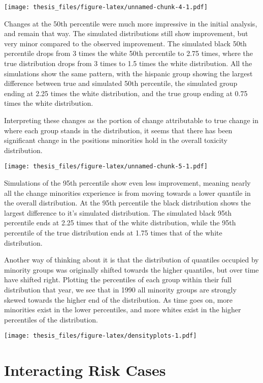 \documentclass[12pt,twoside]{dukestatscithesis}
\theoremstyle{definition}
\theoremstyle{definition}
\theoremstyle{definition}
\theoremstyle{remark}
\begin{document}
\texttt{[image: thesis\_files/figure-latex/unnamed-chunk-4-1.pdf]}

Changes at the 50th percentile were much more impressive in the initial
analysis, and remain that way. The simulated distributions still show
improvement, but very minor compared to the observed improvement. The
simulated black 50th percentile drops from 3 times the white 50th
percentile to 2.75 times, where the true distribution drops from 3 times
to 1.5 times the white distribution. All the simulations show the same
pattern, with the hispanic group showing the largest difference between
true and simulated 50th percentile, the simulated group ending at 2.25
times the white distribution, and the true group ending at 0.75 times
the white distribution.

Interpreting these changes as the portion of change attributable to true
change in where each group stands in the distribution, it seems that
there has been significant change in the positions minorities hold in
the overall toxicity distribution.

\texttt{[image: thesis\_files/figure-latex/unnamed-chunk-5-1.pdf]}

Simulations of the 95th percentile show even less improvement, meaning
nearly all the change minorities experience is from moving towards a
lower quantile in the overall distribution. At the 95th percentile the
black distribution shows the largest difference to it's simulated
distribution. The simulated black 95th percentile ends at 2.25 times
that of the white distribution, while the 95th percentile of the true
distribution ends at 1.75 times that of the white distribution.

Another way of thinking about it is that the distribution of quantiles
occupied by minority groups was originally shifted towards the higher
quantiles, but over time have shifted right. Plotting the percentiles of
each group within their full distribution that year, we see that in 1990
all minority groups are strongly skewed towards the higher end of the
distribution. As time goes on, more minorities exist in the lower
percentiles, and more whites exist in the higher percentiles of the
distribution.

\texttt{[image: thesis\_files/figure-latex/densityplots-1.pdf]}

\section{Interacting Risk Cases}\label{interacting-risk-cases}
\end{document}
